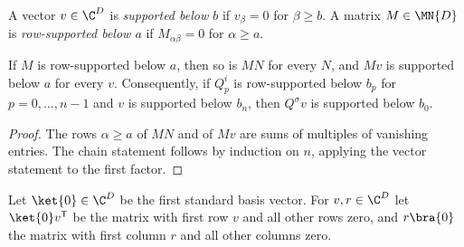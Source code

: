 \begin{definition}
    \label{def:seqanc_support}
    \leanok
    A vector $v\in\C^D$ is \emph{supported below $b$} if $v_\beta=0$ for
    $\beta\ge b$. A matrix $M\in\MN{D}$ is \emph{row-supported below $a$} if
    $M_{\alpha\beta}=0$ for $\alpha\ge a$.
\end{definition}

\begin{lemma}
    \label{thm:seqanc_support_propagation}
    \leanok
    If $M$ is row-supported below $a$, then so is $MN$ for every $N$, and
    $Mv$ is supported below $a$ for every $v$. Consequently, if $Q_p^i$ is
    row-supported below $b_p$ for $p=0,\dots,n-1$ and $v$ is supported
    below $b_n$, then $Q^\sigma v$ is supported below $b_0$.
\end{lemma}
\begin{proof}
    \leanok
    The rows $\alpha\ge a$ of $MN$ and of $Mv$ are sums of multiples of
    vanishing entries. The chain statement follows by induction on $n$,
    applying the vector statement to the first factor.
\end{proof}

\begin{definition}
    \label{def:seqanc_boundary}
    \leanok
    Let $\ket{0}\in\C^D$ be the first standard basis vector. For
    $v,r\in\C^D$ let $\ket{0}v^{\mathsf T}$ be the matrix with first row $v$
    and all other rows zero, and $r\bra{0}$ the matrix with first column $r$
    and all other columns zero.
\end{definition}

